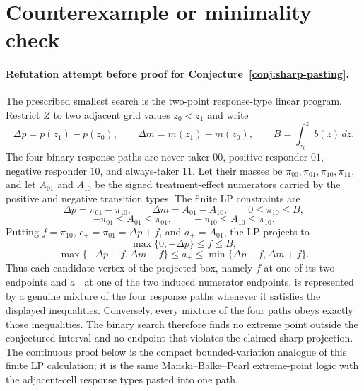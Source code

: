 \documentclass[11pt]{article}
\theoremstyle{definition}
\theoremstyle{plain}
\theoremstyle{remark}
\begin{document}
\section{Counterexample or minimality check}
\paragraph{Refutation attempt before proof for Conjecture~\ref{conj:sharp-pasting}.}
The prescribed smallest search is the two-point response-type linear program.
Restrict \(Z\) to two adjacent grid values \(z_0<z_1\) and write
\[
\Delta p=p(z_1)-p(z_0),\qquad
\Delta m=m(z_1)-m(z_0),\qquad
B=\int_{z_0}^{z_1}b(z)\,dz .
\]
The four binary response paths are never-taker \(00\), positive responder
\(01\), negative responder \(10\), and always-taker \(11\).  Let their masses
be \(\pi_{00},\pi_{01},\pi_{10},\pi_{11}\), and let \(A_{01}\) and \(A_{10}\)
be the signed treatment-effect numerators carried by the positive and
negative transition types.  The finite LP constraints are
\[
\Delta p=\pi_{01}-\pi_{10},\qquad
\Delta m=A_{01}-A_{10},\qquad
0\le\pi_{10}\le B,
\]
\[
-\pi_{01}\le A_{01}\le\pi_{01},
\qquad
-\pi_{10}\le A_{10}\le\pi_{10}.
\]
Putting \(f=\pi_{10}\), \(c_+=\pi_{01}=\Delta p+f\), and
\(a_+=A_{01}\), the LP projects to
\[
\max\{0,-\Delta p\}\le f\le B,
\]
\[
\max\{-\Delta p-f,\Delta m-f\}\le a_+\le
\min\{\Delta p+f,\Delta m+f\}.
\]
Thus each candidate vertex of the projected box, namely \(f\) at one of its
two endpoints and \(a_+\) at one of the two induced numerator endpoints,
is represented by a genuine mixture of the four response paths whenever it
satisfies the displayed inequalities.  Conversely, every mixture of the four
paths obeys exactly those inequalities.  The binary search therefore finds no
extreme point outside the conjectured interval and no endpoint that violates
the claimed sharp projection.  The continuous proof below is the compact
bounded-variation analogue of this finite LP calculation; it is the same
Manski--Balke--Pearl extreme-point logic with the adjacent-cell response
types pasted into one path.
\end{document}
